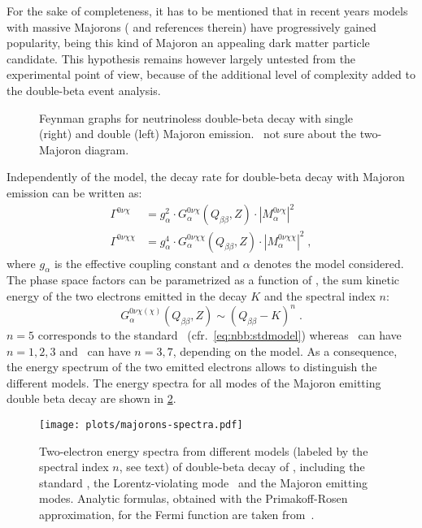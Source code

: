 For the sake of completeness, it has to be mentioned that in recent years
models with massive Majorons (\cite{Blum2018} and references therein) have
progressively gained popularity, being this kind of Majoron an appealing dark
matter particle candidate. This hypothesis remains however largely untested
from the experimental point of view, because of the additional level of
complexity added to the double-beta event analysis.

\begin{figure}
  \centering%
  \caption{%
    Feynman graphs for neutrinoless double-beta decay with single (right) and
    double (left) Majoron emission. \fillme\ not sure about the two-Majoron diagram.
  }\label{fig:nbb:majfeydiag}
\end{figure}

Independently of the model, the decay rate for double-beta decay with Majoron
emission can be written as:
\begin{align*}
  \Gamma^{0\nu\chi}  &= g_\alpha^2 \cdot G_\alpha^{0\nu\chi}(Q_{\beta\beta}, Z)
    \cdot |M_\alpha^{0\nu\chi}|^2 \\
  \Gamma^{0\nu\chi\chi} &= g_\alpha^4 \cdot G_\alpha^{0\nu\chi\chi}(Q_{\beta\beta}, Z)
    \cdot |M_\alpha^{0\nu\chi\chi}|^2 \;,
\end{align*}
where $g_\alpha$ is the effective coupling constant and $\alpha$ denotes the
model considered. The phase space factors can be parametrized as a
function of \qbb, the sum kinetic energy of the two electrons emitted in
the decay $K$ and the spectral index $n$:
\[
  G_\alpha^{0\nu\chi(\chi)}(Q_{\beta\beta}, Z) \sim (Q_{\beta\beta} - K)^n \;.
\]
$n = 5$ corresponds to the standard \nnbb\ (cfr.~\cref{eq:nbb:stdmodel})
whereas \onbbx\ can have $n = 1, 2, 3$ and \onbbxx\ can have $n = 3, 7$,
depending on the model. As a consequence, the energy spectrum of the two
emitted electrons allows to distinguish the different models. The energy
spectra for all modes of the Majoron emitting double beta decay are shown in
\cref{fig:nbb:majorons-spectra}.

\begin{figure}
  \centering
  \texttt{[image: plots/majorons-spectra.pdf]}
  \caption{%
    Two-electron energy spectra from different models (labeled by the spectral
    index $n$, see text) of double-beta decay of \gesix, including the standard
    \nnbb, the Lorentz-violating mode \nnbblv\ and the Majoron emitting
    modes.  Analytic formulas, obtained with the Primakoff-Rosen approximation,
    for the Fermi function are taken from~\cite{Tretyak1995, Tretyak2002}.
  }\label{fig:nbb:majorons-spectra}
\end{figure}

